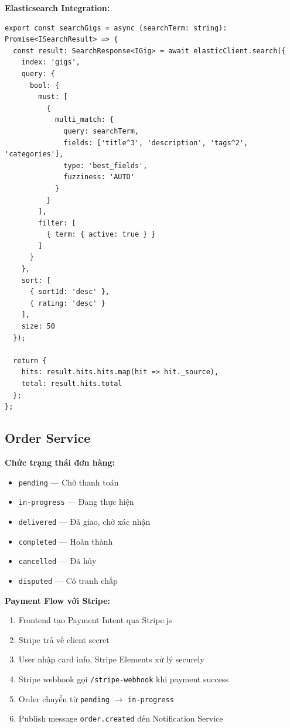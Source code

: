 \documentclass[12pt]{extreport}
\begin{document}
\textbf{Elasticsearch Integration:}
\begin{lstlisting}[style=TypeScriptStyle, caption={Gig Search Implementation}]
export const searchGigs = async (searchTerm: string): Promise<ISearchResult> => {
  const result: SearchResponse<IGig> = await elasticClient.search({
    index: 'gigs',
    query: {
      bool: {
        must: [
          {
            multi_match: {
              query: searchTerm,
              fields: ['title^3', 'description', 'tags^2', 'categories'],
              type: 'best_fields',
              fuzziness: 'AUTO'
            }
          }
        ],
        filter: [
          { term: { active: true } }
        ]
      }
    },
    sort: [
      { sortId: 'desc' },
      { rating: 'desc' }
    ],
    size: 50
  });
  
  return {
    hits: result.hits.hits.map(hit => hit._source),
    total: result.hits.total
  };
};
\end{lstlisting}

\subsection{Order Service}

\textbf{Chức trạng thái đơn hàng:}
\begin{itemize}
    \item \texttt{pending} --- Chờ thanh toán
    \item \texttt{in-progress} --- Đang thực hiện
    \item \texttt{delivered} --- Đã giao, chờ xác nhận
    \item \texttt{completed} --- Hoàn thành
    \item \texttt{cancelled} --- Đã hủy
    \item \texttt{disputed} --- Có tranh chấp
\end{itemize}

\textbf{Payment Flow với Stripe:}
\begin{enumerate}
    \item Frontend tạo Payment Intent qua Stripe.js
    \item Stripe trả về client secret
    \item User nhập card info, Stripe Elements xử lý securely
    \item Stripe webhook gọi \texttt{/stripe-webhook} khi payment success
    \item Order chuyển từ \texttt{pending} $\rightarrow$ \texttt{in-progress}
    \item Publish message \texttt{order.created} đến Notification Service
\end{enumerate}
\end{document}
